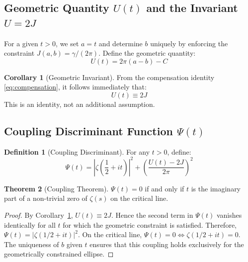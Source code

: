 \documentclass[11pt,a4paper]{article}
\theoremstyle{definition}
\newtheorem{theorem}{Theorem}[section]
\newtheorem{corollary}[theorem]{Corollary}
\newtheorem{definition}{Definition}[section]
\begin{document}
\subsection{Geometric Quantity \(U(t)\) and the Invariant \(U = 2J\)}

For a given \(t > 0\), we set \(a = t\) and determine \(b\) uniquely by enforcing the constraint \(J(a,b) = \gamma/(2\pi)\). 
Define the geometric quantity:
\begin{equation}\label{eq:Udef}
U(t) = 2\pi(a-b) - C
\end{equation}

\begin{corollary}[Geometric Invariant]\label{cor:U2J}
From the compensation identity \eqref{eq:compensation}, it follows immediately that:
\begin{equation}
U(t) \equiv 2J
\end{equation}
This is an identity, not an additional assumption.
\end{corollary}

\subsection{Coupling Discriminant Function \(\Psi(t)\)}

\begin{definition}[Coupling Discriminant]
For any \(t > 0\), define:
\begin{equation}\label{eq:Psi}
\Psi(t) = \left|\zeta\left(\frac{1}{2}+it\right)\right|^2 + \left( \frac{U(t)-2J}{2\pi} \right)^2
\end{equation}
\end{definition}

\begin{theorem}[Coupling Theorem]\label{thm:coupling}
\(\Psi(t) = 0\) if and only if \(t\) is the imaginary part of a non-trivial zero of \(\zeta(s)\) on the critical line.
\end{theorem}

\begin{proof}
By Corollary~\ref{cor:U2J}, \(U(t) \equiv 2J\). Hence the second term in \(\Psi(t)\) vanishes identically for all \(t\) for which the geometric constraint is satisfied. 
Therefore, \(\Psi(t) = |\zeta(1/2+it)|^2\). 
On the critical line, \(\Psi(t) = 0 \iff \zeta(1/2+it) = 0\). 
The uniqueness of \(b\) given \(t\) ensures that this coupling holds exclusively for the geometrically constrained ellipse.
\end{proof}
\end{document}
